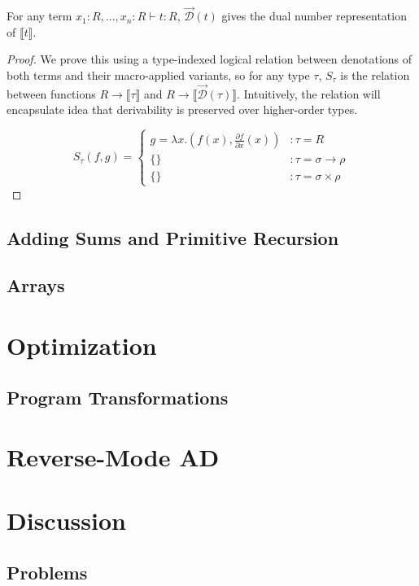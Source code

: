 \documentclass[11pt, final]{article}
\def\D{\overrightarrow{\mathcal{D}}}
\begin{document}
  \begin{theorem}
    For any term $x_1 : R, ..., x_n : R \vdash t : R$, $\D(t)$ gives the dual number representation of $\llbracket t \rrbracket$.
  \end{theorem}

  \begin{proof}
    We prove this using a type-indexed logical relation between denotations of both terms and their macro-applied variants, so for any type $\tau$, $S_\tau$ is the relation between functions $R \rightarrow \llbracket \tau \rrbracket$ and $R \rightarrow \llbracket \D(\tau) \rrbracket$. Intuitively, the relation will encapsulate idea that derivability is preserved over higher-order types.

    \[S_\tau(f, g) =
      \left\{
        \begin{array}{ll}
          g = \lambda x. (f(x), \frac{\partial f}{\partial x}(x))
            & : \tau = R \\
          \{  \} & : \tau = \sigma \rightarrow \rho \\
          \{  \} & : \tau = \sigma \times \rho
        \end{array}
      \right.
    \]
  \end{proof}



  \subsection{Adding Sums and Primitive Recursion}
  \subsection{Arrays}
\section{Optimization}
  \subsection{Program Transformations}
\section{Reverse-Mode AD}
\section{Discussion}
  \subsection{Problems}
\end{document}
